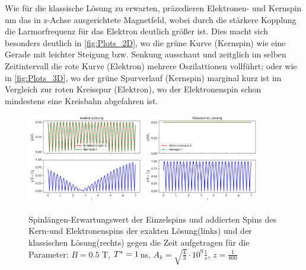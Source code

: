 Wie für die klassische Lösung zu erwarten, präzedieren Elektronen- und Kernspin um das in z-Achse ausgerichtete Magnetfeld, wobei durch die stärkere Kopplung
die Larmorfrequenz für das Elektron deutlich größer ist. Dies macht sich besonders deutlich in \autoref{fig:Plots_2D}, wo die grüne Kurve (Kernspin) wie 
eine Gerade mit leichter Steigung bzw. Senkung ausschaut und zeitglich im selben Zeitintervall die rote Kurve (Elektron) mehrere Oszilattionen vollführt; 
oder wie in \autoref{fig:Plots_3D}, wo der grüne Spurverlauf (Kernspin) marginal kurz ist im Vergleich zur roten Kreisspur (Elektron), 
wo der Elektronenspin schon mindestens eine Kreisbahn abgefahren ist.\\ 
\begin{figure}[h]
    \centering
    \includegraphics[width = 0.45\textwidth]{Abbildungen/Plot_Spin_length.png}
    \includegraphics[width = 0.45\textwidth]{Abbildungen/Plot_Spin_length_Klassisch.png}
    \caption{Spinlängen-Erwartungswert der Einzelspins und addierten Spins des Kern-und Elektronenspins der exakten Lösung(links) und der klassischen 
    Lösung(rechts) gegen die Zeit aufgetragen für die Parameter: $B = 0.5$ T, $T^*= 1 \thinspace$ns, $A_k = \sqrt{\frac{4}{3}}\cdot 10^9 \frac{1}{s}$,
    $z=\frac{1}{800}$}
    \label{fig:Plots_Spinlength}
\end{figure}


